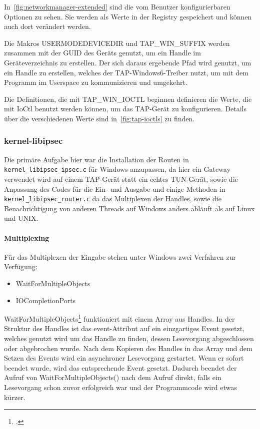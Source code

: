{In~\autoref{fig:networkmanager-extended} sind die vom Benutzer konfigurierbaren Optionen zu sehen.
Sie werden als Werte in der Registry gespeichert und können auch dort verändert werden.

Die Makros USERMODEDEVICEDIR und TAP\_WIN\_SUFFIX werden zusammen mit der GUID des Geräts
genutzt, um ein Handle im Geräteverzeichnis zu erstellen. Der sich daraus ergebende Pfad
wird genutzt, um ein Handle zu erstellen, welches der TAP-Windows6-Treiber nutzt, um
mit dem Programm im Userspace zu kommunizieren und umgekehrt.

Die Definitionen, die mit TAP\_WIN\_IOCTL beginnen definieren die Werte, die mit
IoCtl benutzt werden können, um das TAP-Gerät zu konfigurieren. Details über die verschiedenen
Werte sind in~\autoref{fig:tap-ioctls} zu finden.


\subsubsection{kernel-libipsec}
Die primäre Aufgabe hier war die Installation der Routen in \texttt{kernel\_libipsec\_ipsec.c}
für Windows anzupassen, da hier ein Gateway verwendet wird auf einem TAP-Gerät
statt ein echtes TUN-Gerät, sowie die Anpassung des Codes für die Ein- und Ausgabe 
und einige Methoden in
\texttt{kernel\_libipsec\_router.c} da das Multiplexen der Handles, sowie die Benachrichtigung
von anderen Threads auf Windows anders abläuft als auf Linux und UNIX.

\paragraph{Multiplexing}
Für das Multiplexen der Eingabe stehen unter Windows zwei Verfahren zur Verfügung:
\begin{itemize}
\item WaitForMultipleObjects
\item IOCompletionPorts
\end{itemize}

WaitForMultipleObjects\footcite[][]{_waitformultipleobjects_2016} funktioniert mit einem Array aus Handles. In der Struktur des Handles
ist das event-Attribut auf ein einzgartiges Event gesetzt, welches genutzt wird um
das Handle zu finden, dessen Lesevorgang abgeschlossen oder abgebrochen wurde.
Nach dem Kopieren des Handles in das Array und dem Setzen des Events wird ein asynchroner
Lesevorgang gestartet. Wenn er sofort beendet wurde, wird das entsprechende Event gesetzt.
Dadurch beendet der Aufruf von WaitForMultipleObjects() nach dem Aufruf direkt, falls
ein Lesevorgang schon zuvor erfolgreich war und der Programmcode wird etwas kürzer.

}
